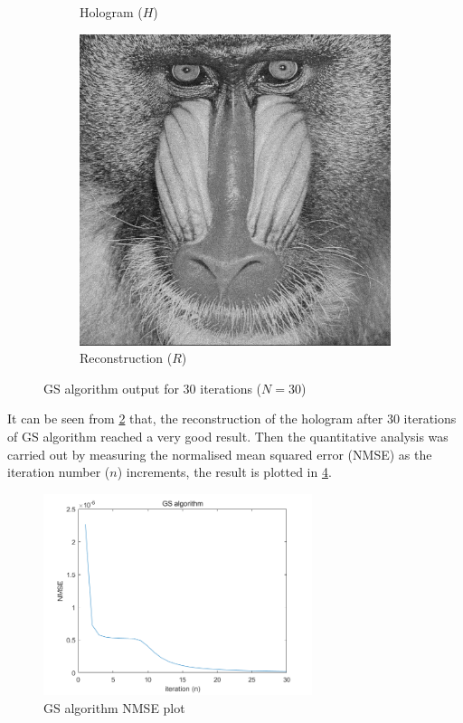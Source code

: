 \begin{figure}[H]
\begin{subfigure}[t]{0.3\textwidth}
    \caption{Hologram ($H$)}
    \label{fig:GS_holo_i_30}
  \end{subfigure}
  \hfill
  \begin{subfigure}[t]{0.3\textwidth}
    \centering
    \includegraphics[width=\textwidth]{GS_recon_i_30.png}
    \caption{Reconstruction ($R$)}
    \label{fig:GS_recon_i_30}
  \end{subfigure}
  \caption{GS algorithm output for 30 iterations ($N = 30$)}
  \label{fig:GS algorithm output}
\end{figure}

It can be seen from \cref{fig:GS_recon_i_30} that, the reconstruction of the hologram after 30 iterations of GS algorithm reached a very good result. Then the quantitative analysis was carried out by measuring the normalised mean squared error (NMSE) as the iteration number ($n$) increments, the result is plotted in \cref{fig:GS_NMSE_plot}.

\begin{figure}[H]
  \centering
  \includegraphics[width=0.7\textwidth]{GS_NMSE_plot.png}
  \caption{GS algorithm NMSE plot}
  \label{fig:GS_NMSE_plot}
\end{figure}

